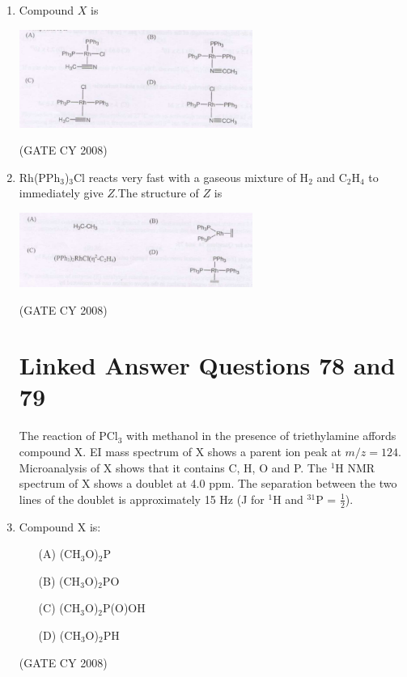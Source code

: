 \documentclass[12pt]{article}
\begin{document}
\begin{enumerate}
\item Compound $X$ is

\begin{center}
\includegraphics[width=0.6\textwidth]{figs/q76_2.png}
\end{center}    \hfill{(GATE CY 2008)}


\item Rh(PPh$_3$)$_3$Cl reacts very fast with a gaseous mixture of H$_2$ and C$_2$H$_4$ to immediately give $Z$.The structure of $Z$ is

\begin{center}
\includegraphics[width=0.6\textwidth]{figs/q77.png}
\end{center}    \hfill{(GATE CY 2008)}


\section*{Linked Answer Questions 78 and 79}

The reaction of PCl$_3$ with methanol in the presence of triethylamine affords compound X. EI mass spectrum of X shows a parent ion peak at $m/z = 124$. Microanalysis of X shows that it contains C, H, O and P. The $^1$H NMR spectrum of X shows a doublet at 4.0 ppm. The separation between the two lines of the doublet is approximately 15 Hz (J for $^1$H and $^{31}$P = $\tfrac{1}{2}$).


    \item Compound X is:
    \begin{enumerate}
        \item[(A)] (CH$_3$O)$_2$P
        \item[(B)] (CH$_3$O)$_2$PO
        \item[(C)] (CH$_3$O)$_2$P(O)OH
        \item[(D)] (CH$_3$O)$_2$PH
    \end{enumerate}    \hfill{(GATE CY 2008)}



\end{enumerate}
\end{document}
